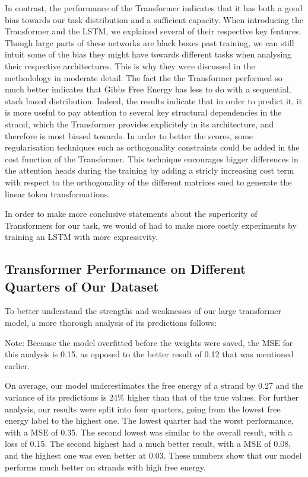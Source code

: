 \documentclass[11pt]{article}
\begin{document}
In contrast, the performance of the Transformer indicates that it has both a good bias towards our task distribution and a sufficient capacity. When introducing the Transformer and the LSTM, we explained several of their respective key features. Though large parts of these networks are black boxes past training, we can still intuit some of the bias they might have towards different tasks when analysing their respective architectures. This is why they were discussed in the methodology in moderate detail. The fact the the Transformer performed so much better indicates that Gibbs Free Energy has less to do with a sequential, stack based distribution. Indeed, the results indicate that in order to predict it, it is more useful to pay attention to several key structural dependencies in the strand, which the Transformer provides explicitely in its architecture, and therefore is most biased towards. In order to better the scores, some regularisation techniques such as orthogonality constraints \cite{zhang-etal-2021-orthogonality} could be added in the cost function of the Transformer. This technique encourages bigger differences in the attention heads during the training by adding a stricly increasing cost term with respect to the orthogonality of the different matrices sued to generate the linear token transformations.


In order to make more conclusive statements about the superiority of Transformers for our task, we would of had to make more costly experiments by training an LSTM with more expressivity. 



\subsection{Transformer Performance on Different Quarters of Our Dataset}
To better understand the strengths and weaknesses of our large transformer model, a more thorough analysis of its predictions follows:

Note: Because the model overfitted before the weights were saved, the MSE for this analysis is 0.15, as opposed to the better result of 0.12 that was mentioned earlier.

On average, our model underestimates the free energy of a strand by 0.27 and the variance of its predictions is 24\% higher than that of the true values. For further analysis, our results were split into four quarters, going from the lowest free energy label to the highest one. The lowest quarter had the worst performance, with a MSE of 0.35. The second lowest was similar to the overall result, with a loss of 0.15. The second highest had a much better result, with a MSE of 0.08, and the highest one was even better at 0.03. These numbers show that our model performs much better on strands with high free energy.
\end{document}
